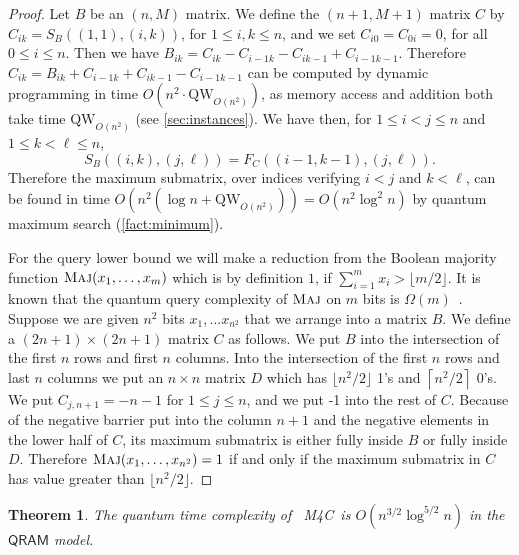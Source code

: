 \documentclass[12pt]{article}
\newcommand{\qw}{\mathrm{QW}}
\newcommand{\floor}[1]{\lfloor #1 \rfloor}
\newcommand{\ceil}[1]{\left\lceil #1 \right\rceil}
\DeclareMathOperator{\Maj}{\textsc{Maj}}
\newcommand{\MaxFourC}{\textsc{M4C}}
\newtheorem{theorem}{Theorem}
\theoremstyle{definition}
\begin{document}
\begin{proof}
Let $B$ be an $(n,M)$ matrix. We define the $(n+1,M+1)$ matrix $C$ by $C_{ik} = S_B((1,1),(i,k))$, for $1 \leq i,k \leq n$, and 
we set $C_{i0}=C_{0i} = 0$, for all $0 \leq i \leq n$.
Then we have $B_{ik} = C_{ik} - C_{i-1k} - C_{ik-1} + C_{i-1k-1}$.
Therefore $C_{ik} = B_{ik} + C_{i-1k} + C_{ik-1} - C_{i-1k-1}$ can be computed by dynamic programming in time $O(n^2\cdot\qw_{O(n^2)})$, as memory access and addition both take time $\qw_{O(n^2)}$ (see \cref{sec:instances}).
We have then, for $1 \leq i < j \leq n$ and $1 \leq k < \ell \leq n$, $$S_B((i,k),(j,\ell)) = F_C((i-1,k-1),(j,\ell)).$$
Therefore the maximum submatrix, over indices verifying $i < j $ and $k < \ell $, can be found in time  $O(n^2(\log  n+ \qw_{O(n^2)})) = O(n^2\log^2 n)$ by quantum maximum search (\cref{fact:minimum}). 

For the query lower bound we will make a reduction from the Boolean majority function $\Maj(x_1, \ldots, x_m)$ which is by definition $1$, if $\sum_{i=1}^m x_i > \floor{m/2}$.
It is known that the quantum query complexity of $\Maj$ on $m$ bits is $\Omega(m)$~\cite{BBCMW01}. Suppose we are given $n^2$ bits $x_{1}, \ldots x_{n^2}$ that we arrange into a matrix $B$.
We define a $(2n+1) \times (2n+1)$ matrix $C$ as follows. We put $B$ into the intersection of the first $n$ rows and first $n$ columns.
Into the intersection of the first $n$ rows and last $n$ columns we put an $n \times n$ matrix $D$ which has $\floor{n^2/2}$ 1's and 
$\ceil{n^2/2}$ 0's. We put $C_{j,n+1}= -n-1$ for $1 \leq j \leq n$, and we put -1 into the rest of $C$. Because of the negative barrier put into the column $n+1$ and the negative elements in the lower half of $C$, its maximum submatrix is either fully inside $B$ or fully inside $D$.  
Therefore $\Maj(x_1, \ldots, x_{n^2}) = 1$ if and only if the maximum submatrix in $C$ has value greater than $\floor{n^2/2}$.
\end{proof}


\begin{theorem}
\label{thm:mfc}
The quantum time complexity of \ \MaxFourC ~is ${O}(n^{3/2} \log^{5/2} n)$ in the $\mathsf{QRAM}$ model. 
\end{theorem}
\end{document}
